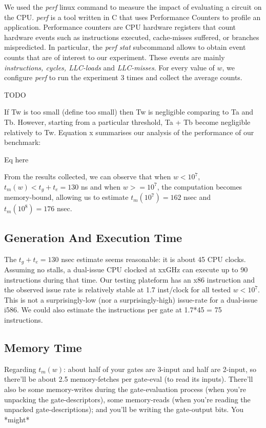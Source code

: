 \par
We used the \textit{perf} linux command to measure the impact of evaluating a circuit on the CPU. \textit{perf} is a tool written in C that uses Performance Counters to profile an application. Performance counters are CPU hardware registers that count hardware events such as instructions executed, cache-misses suffered, or branches mispredicted\cite{perf}. In particular, the \textit{perf stat} subcommand allows to obtain event counts that are of interest to our experiment. These events are mainly \textit{instructions, cycles, LLC-loads} and \textit{LLC-misses}. For every value of $w$, we configure \textit{perf} to run the experiment 3 times and collect the average counts.


\par
TODO
\par
If Tw is too small (define too small) then Tw is negligible comparing to Ta and Tb. However, starting from a particular threshold, Ta + Tb become negligible relatively to Tw.
Equation x summarises our analysis of the performance of our benchmark:
\par
Eq here

From the results collected, we can observe that when $w < 10^7$, $t_m(w) < t_g + t_e = 130$ ns and when $w >= 10^7$, the computation becomes memory-bound, allowing us to estimate $t_m(10^7) = 162$ nsec and $t_m(10^8) = 176$ nsec.

\subsection{Generation  And Execution Time}
The $t_g + t_e = 130$ nsec estimate seems reasonable: it is about 45 CPU clocks. Assuming no stalls, a dual-issue CPU clocked at xxGHz can execute up to 90 instructions during that time. Our testing plateform has an x86 instruction and the observed issue rate is relatively stable at 1.7 inst/clock for all tested $w < 10^7$.  This is not a surprisingly-low (nor a surprisingly-high) issue-rate for a dual-issue i586.  We could also estimate the instructions per gate at  1.7*45 = 75 instructions.
\subsection{Memory Time}
Regarding $t_m(w)$: about half of your gates are 3-input and half are 2-input, so there'll be about 2.5 memory-fetches per gate-eval (to read its inputs).  There'll also be some memory-writes during the gate-evaluation process (when you're unpacking the gate-descriptors), some memory-reads (when you're reading the unpacked gate-descriptions); and you'll be writing the gate-output bits.   You *might*


